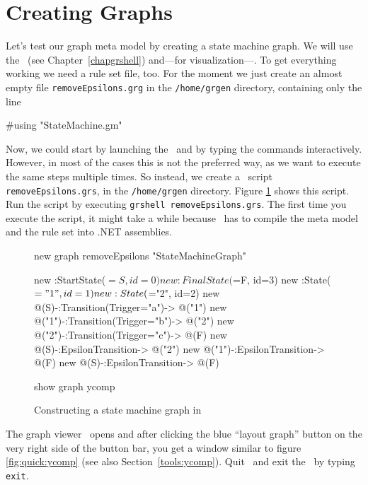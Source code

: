 \section{Creating Graphs}
\label{sct:quick:create}

Let's test our graph meta model by creating a state machine graph.
We will use the \GrShell\ (see Chapter~\ref{chapgrshell}) and---for visualization---\yComp.
To get everything working we need a rule set file, too.
For the moment we just create an almost empty file \texttt{removeEpsilons.grg} in the \texttt{/home/grgen} directory, containing only the line
\begin{grgen}
#using "StateMachine.gm"
\end{grgen}
Now, we could start by launching the \GrShell\ and by typing the commands interactively.
However, in most of the cases this is not the preferred way, as we want to execute the same steps multiple times.
So instead, we create a \GrShell\ script \texttt{removeEpsilons.grs}, in the \texttt{/home/grgen} directory.
Figure \ref{fig:quick:shell} shows this script.
Run the script by executing \texttt{grshell removeEpsilons.grs}.
The first time you execute the script, it might take a while because \GrG\ has to compile the meta model and the rule set into .NET assemblies.

\begin{figure}[htbp]
    \centering
    \begin{grgen}
new graph removeEpsilons "StateMachineGraph"

new :StartState($=S, id=0)
new :FinalState($=F, id=3)
new :State($="1", id=1)
new :State($="2", id=2)
new @(S)-:Transition(Trigger="a")-> @("1")
new @("1")-:Transition(Trigger="b")-> @("2")
new @("2")-:Transition(Trigger="c")-> @(F)
new @(S)-:EpsilonTransition-> @("2")
new @("1")-:EpsilonTransition-> @(F)
new @(S)-:EpsilonTransition-> @(F)

show graph ycomp
    \end{grgen}
    \caption{Constructing a state machine graph in \GrShell}
    \label{fig:quick:shell}
\end{figure}

The graph viewer \yComp\ opens and after clicking the blue ``layout graph'' button on the very right side of the button bar, you get a window similar to figure \ref{fig:quick:ycomp} (see also Section~\ref{tools:ycomp}).
Quit \yComp\ and exit the \GrShell\ by typing \texttt{exit}.

